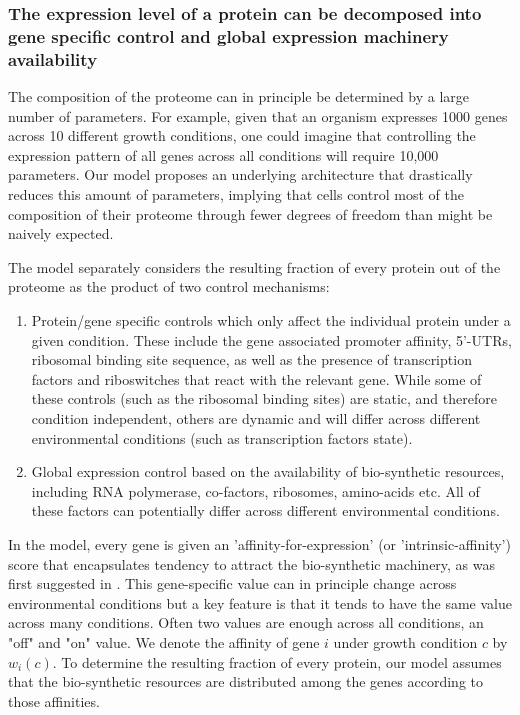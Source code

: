 \subsubsection{The expression level of a protein can be decomposed into gene specific control and global
expression machinery availability}
The composition of the proteome can in principle be determined by a large number of parameters.
For example, given that an organism expresses 1000 genes across 10 different growth conditions, one could imagine that controlling the expression pattern of all genes across all conditions will require 10,000 parameters.
Our model proposes an underlying architecture that drastically reduces this amount of parameters, implying that cells control most of the composition of their proteome through fewer degrees of freedom than might be naively expected.

The model separately considers the resulting fraction of every protein out of the proteome as the product of two control mechanisms:
\begin{enumerate}
\item Protein/gene specific controls which only affect the individual protein under a given condition. These include the gene associated promoter affinity, 5'-UTRs, ribosomal binding site sequence, as well as the presence of transcription factors and riboswitches that react with the relevant gene.
  While some of these controls (such as the ribosomal binding sites) are static, and therefore condition independent, others are dynamic and will differ across different environmental conditions (such as transcription factors state).
\item Global expression control based on the availability of bio-synthetic resources, including RNA polymerase, co-factors, ribosomes, amino-acids etc.
  All of these factors can potentially differ across different environmental conditions.
\end{enumerate}

In the model, every gene is given an 'affinity-for-expression' (or 'intrinsic-affinity') score that encapsulates tendency to attract the bio-synthetic machinery, as was first suggested in \cite{Maaloe1969}.
This gene-specific value can in principle change across environmental conditions but a key feature is that it tends to have the same value across many conditions.
Often two values are enough across all conditions, an "off" and "on" value.
We denote the affinity of gene $i$ under growth condition $c$ by $w_i(c)$.
To determine the resulting fraction of every protein, our model assumes that the bio-synthetic resources are distributed among the genes according to those affinities.

